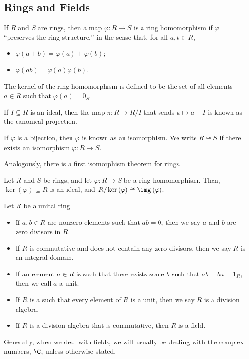 \subsection{Rings and Fields}%
\begin{definition}
  If $R$ and $S$ are rings, then a map $\varphi\colon R\rightarrow S$ is a ring homomorphism if $\varphi$ ``preserves the ring structure,'' in the sense that, for all $a,b\in R$,
  \begin{itemize}
    \item $\varphi\left(a+b\right) = \varphi\left(a\right) + \varphi\left(b\right)$;
    \item $\varphi\left(ab\right) = \varphi\left(a\right)\varphi\left(b\right)$.
  \end{itemize}
  The kernel of the ring homomorphism is defined to be the set of all elements $a\in R$ such that $\varphi\left(a\right) = 0_{S}$.\newline

  If $I \subseteq R$ is an ideal, then the map $\pi\colon R\rightarrow R/I$ that sends $a \mapsto a + I$ is known as the canonical projection.\newline

  If $\varphi$ is a bijection, then $\varphi$ is known as an isomorphism. We write $R\cong S$ if there exists an isomorphism $\varphi\colon R\rightarrow S$.
\end{definition}
Analogously, there is a first isomorphism theorem for rings.
\begin{theorem}
  Let $R$ and $S$ be rings, and let $\varphi\colon R\rightarrow S$ be a ring homomorphism. Then, $\ker\left(\varphi\right)\subseteq R$ is an ideal, and $R/\ker\left(\varphi\right)\cong \img\left(\varphi\right)$.
\end{theorem}
\begin{definition}
  Let $R$ be a unital ring.
  \begin{itemize}
    \item If $a,b\in R$ are nonzero elements such that $ab = 0$, then we say $a$ and $b$ are zero divisors in $R$.
    \item If $R$ is commutative and does not contain any zero divisors, then we say $R$ is an integral domain.
    \item If an element $a\in R$ is such that there exists some $b$ such that $ab = ba = 1_R$, then we call $a$ a unit.
    \item If $R$ is a such that every element of $R$ is a unit, then we say $R$ is a division algebra.
    \item If $R$ is a division algebra that is commutative, then $R$ is a field.
  \end{itemize}
\end{definition}
\begin{remark}
  Generally, when we deal with fields, we will usually be dealing with the complex numbers, $\C$, unless otherwise stated.
\end{remark}
